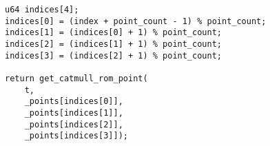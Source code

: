 \begin{lstlisting}
u64 indices[4];
indices[0] = (index + point_count - 1) % point_count;
indices[1] = (indices[0] + 1) % point_count;
indices[2] = (indices[1] + 1) % point_count;
indices[3] = (indices[2] + 1) % point_count;

return get_catmull_rom_point(
    t,
    _points[indices[0]],
    _points[indices[1]],
    _points[indices[2]],
    _points[indices[3]]);
\end{lstlisting}
